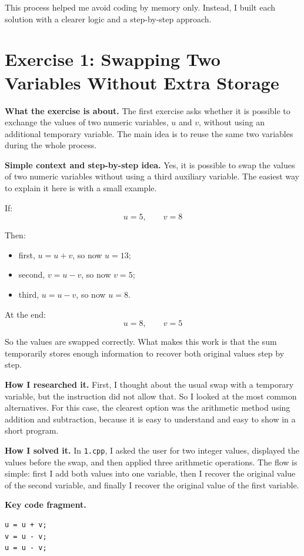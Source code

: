 \documentclass[12pt,a4paper]{article}
\begin{document}
This process helped me avoid coding by memory only. Instead, I built each solution with a clearer logic and a step-by-step approach.

\section*{Exercise 1: Swapping Two Variables Without Extra Storage}
\textbf{What the exercise is about.} The first exercise asks whether it is possible to exchange the values of two numeric variables, \(u\) and \(v\), without using an additional temporary variable. The main idea is to reuse the same two variables during the whole process.

\textbf{Simple context and step-by-step idea.} Yes, it is possible to swap the values of two numeric variables without using a third auxiliary variable. The easiest way to explain it here is with a small example.

If:
\[
u = 5,\qquad v = 8
\]

Then:
\begin{itemize}
\item first, \(u = u + v\), so now \(u = 13\);
\item second, \(v = u - v\), so now \(v = 5\);
\item third, \(u = u - v\), so now \(u = 8\).
\end{itemize}

At the end:
\[
u = 8,\qquad v = 5
\]

So the values are swapped correctly. What makes this work is that the sum temporarily stores enough information to recover both original values step by step.

\textbf{How I researched it.} First, I thought about the usual swap with a temporary variable, but the instruction did not allow that. So I looked at the most common alternatives. For this case, the clearest option was the arithmetic method using addition and subtraction, because it is easy to understand and easy to show in a short program.

\textbf{How I solved it.} In \texttt{1.cpp}, I asked the user for two integer values, displayed the values before the swap, and then applied three arithmetic operations. The flow is simple: first I add both values into one variable, then I recover the original value of the second variable, and finally I recover the original value of the first variable.

\textbf{Key code fragment.}
\begin{lstlisting}
u = u + v;
v = u - v;
u = u - v;
\end{lstlisting}
\end{document}
